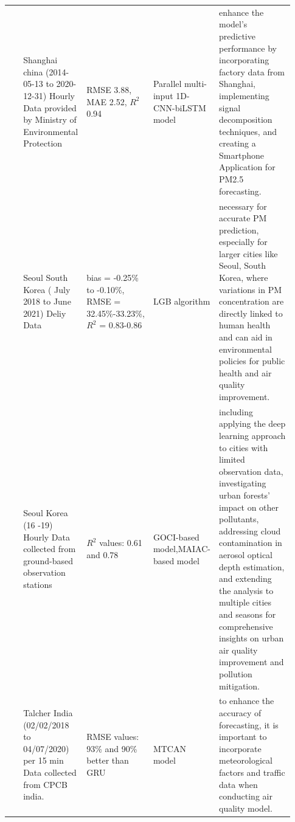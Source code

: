 \documentclass[a4paper,fleqn]{cas-dc}
\begin{document}
\begin{landscape}
{\begin{longtable}[h!]{ p{0.1\linewidth} p{0.2\linewidth} p{0.14\linewidth} p{0.11\linewidth} p{0.38\linewidth} }
 \cite{zhu2023investigation}            & Shanghai china (2014-05-13 to 2020-12-31)   Hourly Data provided by Ministry of Environmental Protection & RMSE 3.88, MAE 2.52, $R^2$ 0.94                                                                            & Parallel multi-input 1D-CNN-biLSTM   model                          & enhance the model's predictive performance by incorporating factory data from Shanghai, implementing signal decomposition techniques, and creating a Smartphone Application for PM2.5 forecasting.                                                         \\
 \cite{kim2022short}         & Seoul South Korea ( July 2018 to   June 2021) Deliy Data                                                 & bias = -0.25\% to -0.10\%, RMSE =   32.45\%-33.23\%, $R^2$ = 0.83-0.86                                     & LGB algorithm                                                       & necessary for accurate PM prediction, especially for larger cities like Seoul, South Korea, where variations in PM concentration are directly linked to human health and can aid in environmental policies for public health and air quality improvement.                                                                            \\
  \cite{lee2021potential}            & Seoul Korea (16 -19) Hourly Data   collected from ground-based observation stations                      & $R^2$ values: 0.61 and 0.78                                                                                & GOCI-based model,MAIAC-based   model                                & including applying the deep learning approach to cities with limited observation data, investigating urban forests' impact on other pollutants, addressing cloud contamination in aerosol optical depth estimation, and extending the analysis to multiple cities and seasons for comprehensive insights on urban air quality improvement and pollution mitigation.                                                                     \\
 \cite{samal2021multi}  & Talcher India (02/02/2018 to   04/07/2020) per 15 min Data collected from CPCB india.                    & RMSE values: 93\% and 90\% better than GRU                                                              & MTCAN model                                                         & to enhance the accuracy of forecasting, it is important to incorporate meteorological factors and traffic data when conducting air quality model.                                                               \\

\end{longtable}}
\end{landscape}
\end{document}
